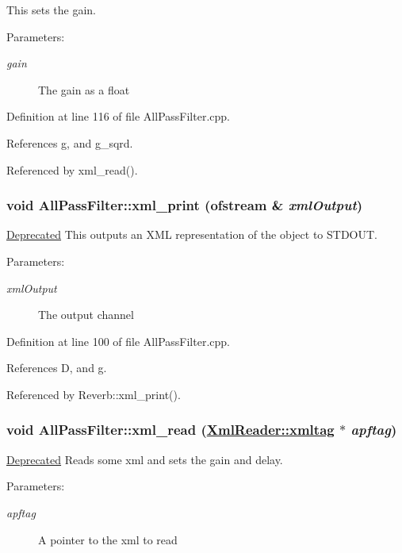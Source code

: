 This sets the gain. \begin{Desc}
\item[Parameters:]
\begin{description}
\item[{\em gain}]The gain as a float \end{description}
\end{Desc}


Definition at line 116 of file All\-Pass\-Filter.cpp.

References g, and g\_\-sqrd.

Referenced by xml\_\-read().\hypertarget{classAllPassFilter_a4}{
\subsubsection[xml\_\-print]{\setlength{\rightskip}{0pt plus 5cm}void All\-Pass\-Filter::xml\_\-print (ofstream \& {\em xml\-Output})}}
\label{classAllPassFilter_a4}


\begin{Desc}
\item[\hyperlink{deprecated__deprecated000002}{Deprecated}]This outputs an XML representation of the object to STDOUT.\end{Desc}
\begin{Desc}
\item[Parameters:]
\begin{description}
\item[{\em xml\-Output}]The output channel \end{description}
\end{Desc}


Definition at line 100 of file All\-Pass\-Filter.cpp.

References D, and g.

Referenced by Reverb::xml\_\-print().\hypertarget{classAllPassFilter_a8}{
\subsubsection[xml\_\-read]{\setlength{\rightskip}{0pt plus 5cm}void All\-Pass\-Filter::xml\_\-read (\hyperlink{classXmlReader_1_1xmltag}{Xml\-Reader::xmltag} $\ast$ {\em apftag})}}
\label{classAllPassFilter_a8}


\begin{Desc}
\item[\hyperlink{deprecated__deprecated000003}{Deprecated}]Reads some xml and sets the gain and delay.\end{Desc}
\begin{Desc}
\item[Parameters:]
\begin{description}
\item[{\em apftag}]A pointer to the xml to read \end{description}
\end{Desc}


